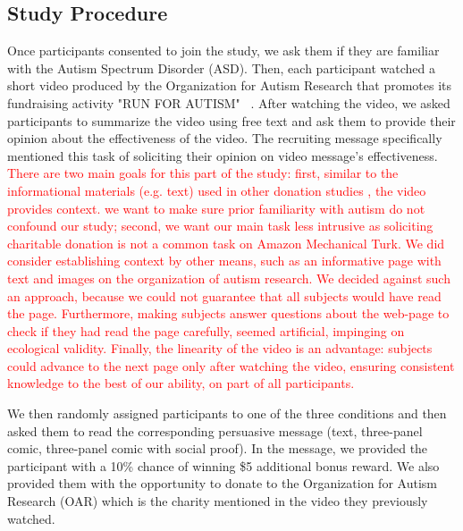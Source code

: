 \subsection{Study Procedure} 
\label{sub:Study Procedure}
Once participants consented to join the study, we ask them if they are familiar with the Autism Spectrum Disorder (ASD). Then, each participant watched a short video produced by the Organization for Autism Research that promotes its fundraising activity "RUN FOR AUTISM" ~\cite{youtube_research}. After watching the video, we asked participants to summarize the video using free text and ask them to provide their opinion about the effectiveness of the video. The recruiting message specifically mentioned this task of soliciting their opinion on video message's effectiveness. \textcolor{red}{There are two main goals for this part of the study: first, similar to the informational materials (e.g. text) used in other donation studies \cite{lee2013does,10362981,FEILER20121322}, the video provides context. we want to make sure prior familiarity with autism do not confound our study; second, we want our main task less intrusive as soliciting charitable donation is not a common task on Amazon Mechanical Turk. We did consider establishing context by other means, such as an informative page with text and images on the organization of autism research. We decided against such an approach, because we could not guarantee that all subjects would have read the page. Furthermore, making subjects answer questions about the web-page to check if they had read the page carefully, seemed artificial, impinging on ecological validity. Finally, the linearity of the video is an advantage: subjects could advance to the next page only after watching the video, ensuring consistent knowledge to the best of our ability, on part of all participants.}

We then randomly assigned participants to one of the three conditions and then asked them to read the corresponding persuasive message (text, three-panel comic, three-panel comic with social proof). In the message, we provided the participant with a 10\% chance of winning \$5 additional bonus reward. We also provided them with the opportunity to donate to the Organization for Autism Research (OAR) which is the charity mentioned in the video they previously watched. 

